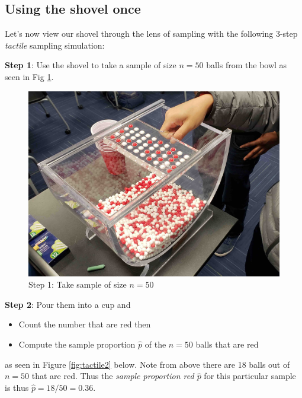 \documentclass[12pt,]{krantz}
\providecommand{\tightlist}{%
  \setlength{\itemsep}{0pt}\setlength{\parskip}{0pt}}
\theoremstyle{definition}
\theoremstyle{definition}
\theoremstyle{definition}
\theoremstyle{remark}
\begin{document}
\subsection{Using the shovel once}\label{using-the-shovel-once}

Let's now view our shovel through the lens of sampling with the
following 3-step \emph{tactile} sampling simulation:

\textbf{Step 1}: Use the shovel to take a sample of size \(n=50\) balls
from the bowl as seen in Fig \ref{fig:tactile1}.

\begin{figure}

{\centering \includegraphics[width=0.8\linewidth]{images/sampling/tactile_1_b} 

}

\caption{Step 1: Take sample of size $n=50$}\label{fig:tactile1}
\end{figure}

\textbf{Step 2}: Pour them into a cup and

\begin{itemize}
\tightlist
\item
  Count the number that are red then
\item
  Compute the sample proportion \(\widehat{p}\) of the \(n=50\) balls
  that are red
\end{itemize}

as seen in Figure \ref{fig:tactile2} below. Note from above there are 18
balls out of \(n=50\) that are red. Thus the \emph{sample proportion red
\(\widehat{p}\)} for this particular sample is thus
\(\widehat{p} = 18 / 50 = 0.36\).
\end{document}
